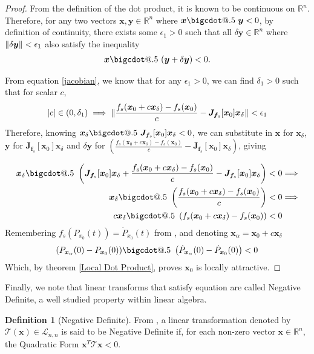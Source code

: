 \documentclass{article}
\makeatletter
\newcommand{\B}[1]{\boldsymbol{#1}}
\newcommand*\bigcdot{\mathpalette\bigcdot@{.5}}
\newcommand*\bigcdot@[2]{\mathbin{\vcenter{\hbox{\scalebox{#2}{$\m@th#1\bullet$}}}}}
\DeclarePairedDelimiter\abs{\lvert}{\rvert}%
\DeclarePairedDelimiter\norm{\lVert}{\rVert}%
\theoremstyle{definition}
\newtheorem{definition}{Definition}[section]
\theoremstyle{remark}
\makeatother
\begin{document}
\begin{proof}
  From the definition of the dot product, it is known to be continuous on $\mathbb{R}^n$.
  Therefore, for any two vectors $\B{x}, \B{y} \in \mathbb{R}^n$ where $\B{x} \bigcdot~ \B{y} < 0$, 
  by definition of continuity, 
  there exists some $\epsilon_1 > 0$ such that all $\delta\B{y} \in \mathbb{R}^n$ where
  $\norm{\delta\B{y}} < \epsilon_1$ also satisfy the inequality
  \begin{align}
     \B{x}  \bigcdot~ (\B{y} + \delta\B{y}) < 0.  \label{eq:1}
  \end{align}

  
  From equation \ref{jacobian}, we know that for any $\epsilon_1 > 0$, we can find $\delta_1 > 0$
  such that for scalar $c$,
  \begin{align}
    \abs{c} \in (0, \delta_1) \implies \norm{\frac{f_s(\B{x}_0 + c \B{x}_\delta) - f_s(\B{x}_0)}{c} - \B{J}_{\B{f}_s}[\B{x}_0] \B{x}_\delta} < \epsilon_1 
  \end{align}
  Therefore, knowing $\B{x}_\delta \bigcdot~ \B{J}_{\B{f}_s}[\B{x}_0] \B{x}_\delta < 0$,
  we can substitute in  $\B{x}$ for $\B{x}_\delta$, $\B{y}$ for $\B{J}_{\B{f}_s}[\B{x}_0] \B{x}_\delta$
  and $\delta\B{y}$ for $(\frac{f_s(\B{x}_0 + c \B{x}_\delta) - f_s(\B{x}_0)}{c} - \B{J}_{\B{f}_s}[\B{x}_0] \B{x}_\delta)$, giving

  \begin{align}
    \B{x}_\delta \bigcdot~ \left(\B{J}_{\B{f}_s}[\B{x}_0] \B{x}_\delta + \frac{f_s(\B{x}_0 + c \B{x}_\delta) - f_s(\B{x}_0)}{c} - \B{J}_{\B{f}_s}[\B{x}_0] \B{x}_\delta \right) &< 0 \Longrightarrow \nonumber\\
    \B{x}_\delta \bigcdot~ \left(\frac{f_s(\B{x}_0 + c \B{x}_\delta) - f_s(\B{x}_0)}{c} \right) &< 0 \Longrightarrow \nonumber \\
    c \B{x}_\delta \bigcdot~ \left({f_s(\B{x}_0 + c \B{x}_\delta) - f_s(\B{x}_0)} \right) &< 0
  \end{align}
  Remembering $f_s(P_{x_0}(t)) = \dot{P}_{x_0}(t)$ from , and denoting $\B{x}_\alpha = \B{x}_0 + c \B{x}_\delta$ 
  \begin{align}
    (P_{\B{x}_\alpha}(0) - P_{\B{x}_0}(0)) \bigcdot~ \left(\dot{P}_{\B{x}_\alpha}(0) - \dot{P}_{\B{x}_0}(0)\right) < 0
  \end{align}
  Which, by theorem \ref{Local Dot Product}, proves $\B{x}_0$ is locally attractive.
\end{proof}

Finally, we note that linear transforms that satisfy equation  are called
Negative Definite, a well studied property within linear algebra.
\begin{definition}[Negative Definite]
  \label{Negative Definite}
  From \cite{LinearAlgebra}, a linear transformation denoted by
  $\mathscr{T}(\B{x}) \in \mathcal{L}_{n,n}$ is said to be Negative Definite
  if, for each non-zero vector $\B{x} \in \mathbb{R}^n$, the Quadratic Form $\B{x}^T \mathscr{T}\B{x} < 0$.
\end{definition}
\end{document}
